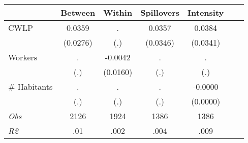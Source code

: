\begin{tabular}{l*{6}{c}}\hline&\multicolumn{1}{c}{Between}&\multicolumn{1}{c}{Within}&\multicolumn{1}{c}{Spillovers}&\multicolumn{1}{c}{Intensity}\\ \hline 
CWLP & 0.0359 & . & 0.0357 & 0.0384 \\
 & (0.0276) & (.) & (0.0346) & (0.0341) \\
Workers & . & -0.0042 & . & . \\
 & (.) & (0.0160) & (.) & (.) \\
\# Habitants & . & . & . & -0.0000 \\
  & (.) & (.) & (.) & (0.0000) \\
\hline \textit{Obs} & 2126 & 1924 & 1386 & 1386  \\ \textit{R2} & .01 & .002 & .004 & .009 \\ \hline \end{tabular}
